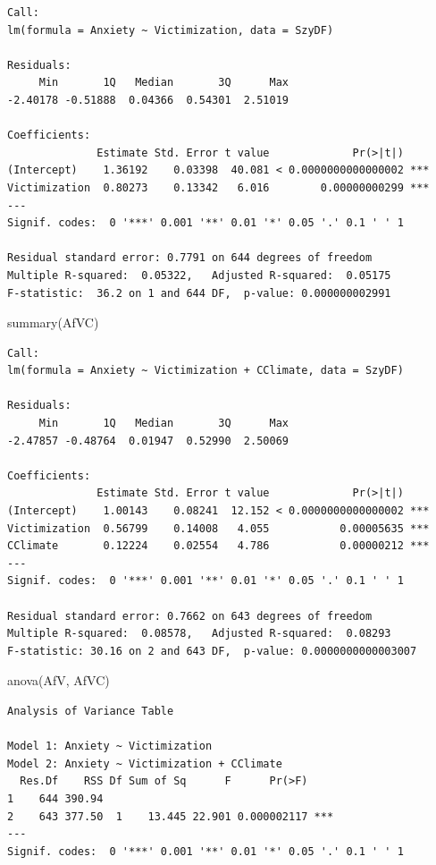 \documentclass[
  english,
]{book}
\newenvironment{Shaded}{\begin{snugshade}}{\end{snugshade}}
\newcommand{\FunctionTok}[1]{\textcolor[rgb]{0.00,0.00,0.00}{#1}}
\newcommand{\NormalTok}[1]{#1}
\begin{document}
\begin{verbatim}
Call:
lm(formula = Anxiety ~ Victimization, data = SzyDF)

Residuals:
     Min       1Q   Median       3Q      Max 
-2.40178 -0.51888  0.04366  0.54301  2.51019 

Coefficients:
              Estimate Std. Error t value             Pr(>|t|)    
(Intercept)    1.36192    0.03398  40.081 < 0.0000000000000002 ***
Victimization  0.80273    0.13342   6.016        0.00000000299 ***
---
Signif. codes:  0 '***' 0.001 '**' 0.01 '*' 0.05 '.' 0.1 ' ' 1

Residual standard error: 0.7791 on 644 degrees of freedom
Multiple R-squared:  0.05322,   Adjusted R-squared:  0.05175 
F-statistic:  36.2 on 1 and 644 DF,  p-value: 0.000000002991
\end{verbatim}

\begin{Shaded}
\begin{Highlighting}[]
\FunctionTok{summary}\NormalTok{(AfVC)}
\end{Highlighting}
\end{Shaded}

\begin{verbatim}
Call:
lm(formula = Anxiety ~ Victimization + CClimate, data = SzyDF)

Residuals:
     Min       1Q   Median       3Q      Max 
-2.47857 -0.48764  0.01947  0.52990  2.50069 

Coefficients:
              Estimate Std. Error t value             Pr(>|t|)    
(Intercept)    1.00143    0.08241  12.152 < 0.0000000000000002 ***
Victimization  0.56799    0.14008   4.055           0.00005635 ***
CClimate       0.12224    0.02554   4.786           0.00000212 ***
---
Signif. codes:  0 '***' 0.001 '**' 0.01 '*' 0.05 '.' 0.1 ' ' 1

Residual standard error: 0.7662 on 643 degrees of freedom
Multiple R-squared:  0.08578,   Adjusted R-squared:  0.08293 
F-statistic: 30.16 on 2 and 643 DF,  p-value: 0.0000000000003007
\end{verbatim}

\begin{Shaded}
\begin{Highlighting}[]
\FunctionTok{anova}\NormalTok{(AfV, AfVC)}
\end{Highlighting}
\end{Shaded}

\begin{verbatim}
Analysis of Variance Table

Model 1: Anxiety ~ Victimization
Model 2: Anxiety ~ Victimization + CClimate
  Res.Df    RSS Df Sum of Sq      F      Pr(>F)    
1    644 390.94                                    
2    643 377.50  1    13.445 22.901 0.000002117 ***
---
Signif. codes:  0 '***' 0.001 '**' 0.01 '*' 0.05 '.' 0.1 ' ' 1
\end{verbatim}
\end{document}
